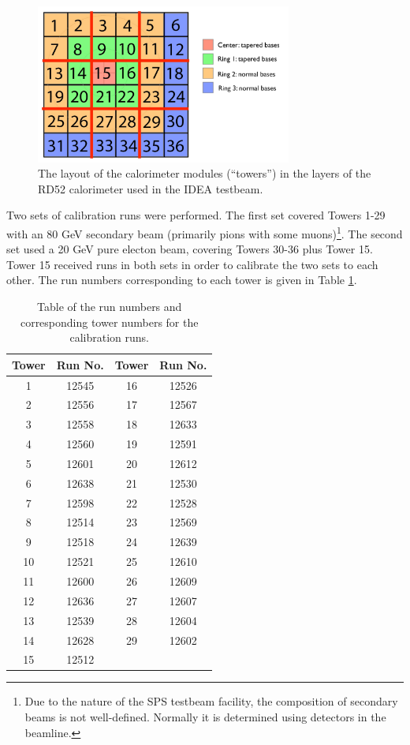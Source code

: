 \begin{figure}[h]
	\centering
	\includegraphics[width=0.75\textwidth]{../Pictures/IDEA/RD52-towers.jpg}
	\caption{The layout of the calorimeter modules (``towers'') in the layers of the RD52 calorimeter used in the \acrshort{IDEA} testbeam.}
	\label{figure:testbeam/results/tower-layout}
\end{figure}

Two sets of calibration runs were performed. The first set covered Towers 1-29 with an 80 GeV secondary beam (primarily pions with some muons)\footnote{Due to the nature of the \acrshort{SPS} testbeam facility, the composition of secondary beams is not well-defined. Normally it is determined using detectors in the beamline.}. The second set used a 20 GeV pure electon beam, covering Towers 30-36 plus Tower 15. Tower 15 received runs in both sets in order to calibrate the two sets to each other. The run numbers corresponding to each tower is given in Table \ref{table:idea/calibrationruns}.

\begin{table}[h]
\centering
	\begin{tabular}{ c c | c c }
	\hline \hline
	\textbf{Tower} & \textbf{Run No.} & \textbf{Tower} & \textbf{Run No.} \\ \hline \hline
	 1 & 12545 & 16 & 12526 \\
	 2 & 12556 & 17 & 12567 \\
	 3 & 12558 & 18 & 12633 \\
	 4 & 12560 & 19 & 12591 \\
	 5 & 12601 & 20 & 12612 \\
	 6 & 12638 & 21 & 12530 \\
	 7 & 12598 & 22 & 12528 \\
	 8 & 12514 & 23 & 12569 \\
	 9 & 12518 & 24 & 12639 \\
	10 & 12521 & 25 & 12610 \\
	11 & 12600 & 26 & 12609 \\
	12 & 12636 & 27 & 12607 \\
	13 & 12539 & 28 & 12604 \\
	14 & 12628 & 29 & 12602 \\
	15 & 12512 &    &    \\ \hline
	\end{tabular}
	\caption{Table of the run numbers and corresponding tower numbers for the calibration runs.}
	\label{table:idea/calibrationruns}
\end{table}

